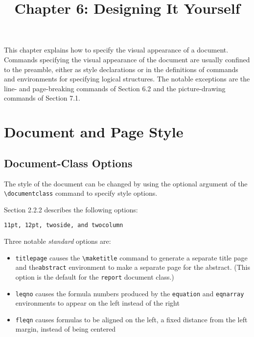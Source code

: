 \documentclass{article}
\title{Chapter 6: Designing It Yourself} %
\author{}
\date{}
\newcommand{\justtext}[1]{\texttt{\textbackslash #1}}
\begin{document}
\maketitle %

This chapter explains how to specify the visual appearance of a document. Commands specifying the
visual appearance of the document are usually confined to the preamble, either as style
declarations or in the definitions of commands and environments for specifying logical structures.
The notable exceptions are the line- and page-breaking commands of Section 6.2 and the
picture-drawing commands of Section 7.1.

\section{Document and Page Style}

\subsection{Document-Class Options}

The style of the document can be changed by using the optional argument of the
\justtext{documentclass} command to specify style options. 

Section 2.2.2 describes the following options: 
\begin{verbatim}11pt, 12pt, twoside, and twocolumn\end{verbatim}

Three notable \emph{standard} options are:

\begin{itemize}
   
   \item {\tt titlepage} causes the \justtext{maketitle} command to generate a separate title page
    and the{\tt abstract} environment to make a separate page for the abstract. (This option is the
    default for the {\tt report} document class.)
   
   \item {\tt leqno} causes the formula numbers produced by the {\tt equation} and {\tt eqnarray}
    environments to appear on the left instead of the right
   
   \item {\tt fleqn} causes formulas to be aligned on the left, a fixed distance from the left
    margin, instead of being centered
\end{itemize}
\end{document}
